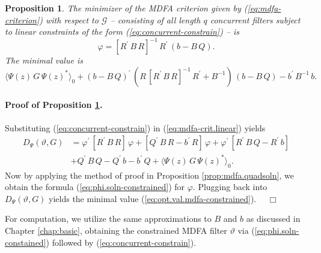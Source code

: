 \documentclass[a4paper]{book}
\newtheorem{Proposition}{Proposition}
\begin{document}
\begin{Proposition}
\label{prop:mdfa.quadsoln-constrain}
 The minimizer of the  MDFA criterion given by   (\ref{eq:mdfa-criterion})
 with respect to  $\mathcal{G}$ -- consisting of all length $q$ concurrent filters 
 subject to  linear constraints of the form (\ref{eq:concurrent-constrain}) -- is
\begin{equation}
\label{eq:phi.soln-constrained}
 \varphi =  { \left[ R^{\prime} \, B \, R \right] }^{-1} \, R^{\prime} \,
 \left( b - B \, Q \right).
\end{equation}
 The minimal value is  
\begin{equation}
\label{eq:opt.val.mdfa-constrained}
{ \langle \Psi (z) \, G \, { \Psi (z) }^* \rangle }_0 
  + {(b - B \, Q)}^{\prime} \, \left( 
  R \, { \left[ R^{\prime} \, B \, R \right] }^{-1} \, R^{\prime} 
  + B^{-1} \right) \, ( b - B \, Q) -   b^{\prime} \, B^{-1} \, b.
\end{equation}
\end{Proposition}

\paragraph{Proof of Proposition \ref{prop:mdfa.quadsoln-constrain}.}
 Substituting (\ref{eq:concurrent-constrain}) in (\ref{eq:mdfa-crit.linear}) yields
\begin{align*}
  D_{\Psi} (\vartheta, G) &  = \varphi^{\prime} \,  \left[ R^{\prime} \, B \, R \right] \,  \varphi 
  + \left[ Q^{\prime} \, B \, R - b^{\prime} \, R \right] \, \varphi + \varphi^{\prime} \,
   \left[ R^{\prime} \, B \, Q - R^{\prime} \, b \right]  \\
 & + Q^{\prime} \, B \, Q  - Q^{\prime} \, b - b^{\prime} \, Q  + { \langle \Psi (z) \, G \, { \Psi (z) }^* \rangle }_0.
\end{align*}
  Now by applying the method of proof in Proposition \ref{prop:mdfa.quadsoln}, we obtain 
  the formula (\ref{eq:phi.soln-constrained}) for $\varphi$.  Plugging back into $D_{\Psi} (\vartheta, G)$
 yields the minimal value (\ref{eq:opt.val.mdfa-constrained}).  $\quad \Box$


\vspace{.5cm}

For computation, we utilize the same approximations to $B$ and $b$ as discussed 
in  Chapter \ref{chap:basic},
 obtaining the constrained MDFA filter $\vartheta$ via (\ref{eq:phi.soln-constained})
 followed by (\ref{eq:concurrent-constrain}).
\end{document}
